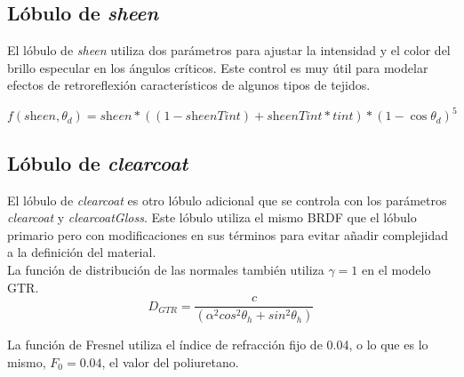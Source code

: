             \subsection*{L\'obulo de \textit{sheen}}
                El l\'obulo de \textit{sheen} utiliza dos par\'ametros para ajustar la intensidad y el color del brillo especular
                en los \'angulos cr\'iticos. Este control es muy \'util para modelar efectos de retroreflexi\'on caracter\'isticos
                de algunos tipos de tejidos.
            
                \begin{equation}
                    f(\textit{sheen}, \theta_d) = \textit{sheen} * ((1 - \textit{sheenTint}) + \textit{sheenTint} * \textit{tint}) * (1 - \cos\theta_d)^5
                \end{equation}

            \subsection*{L\'obulo de \textit{clearcoat}}
                El l\'obulo de \textit{clearcoat} es otro l\'obulo adicional que se controla con los par\'ametros \textit{clearcoat}
                y \textit{clearcoatGloss}. Este l\'obulo utiliza el mismo BRDF que el l\'obulo primario pero con modificaciones
                en sus t\'erminos para evitar a\~nadir complejidad a la definici\'on del material.\\

                La funci\'on de distribuci\'on de las normales tambi\'en utiliza $\gamma = 1$ en el modelo GTR.\\

                \begin{equation}
                    D_{GTR} = \frac
                    {c}
                    {(\alpha^2 cos^2 \theta_h + sin^2 \theta_h)}
                \end{equation}
                \singlespacing

                La funci\'on de Fresnel utiliza el \'indice de refracci\'on fijo de 0.04, o lo que es lo mismo, $F_0 = 0.04$, el valor
                del poliuretano.\\

